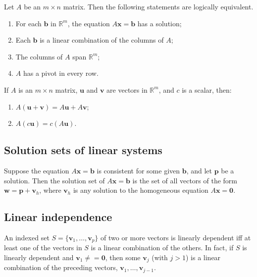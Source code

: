 \documentclass{article}
\begin{document}
\begin{thm}
    Let $A$ be an $m\times n$ matrix. Then the following statements are logically equivalent.
    \begin{enumerate}
        \item[a.] For each $\textbf{b}$ in $\mathbb{R}^m$, the equation $A\textbf{x}=\textbf{b}$ has a solution;
        \item[b.] Each $\textbf{b}$ is a linear combination of the columns of $A$;
        \item[c.] The columns of $A$ span $\mathbb{R}^m$;
        \item[d.] $A$ has a pivot in every row.
    \end{enumerate}
\end{thm}

\begin{thm} 
    If $A$ is an $m\times n$ matrix, $\textbf{u}$ and $\textbf{v}$ are vectors in $\mathbb{R}^m$, and $c$ is a scalar, then:
    \begin{enumerate}
        \item[a.] $A(\textbf{u}+\textbf{v})=A\textbf{u}+A\textbf{v}$;
        \item[b.] $A(c\textbf{u})=c(A\textbf{u})$.
    \end{enumerate}
\end{thm}

\subsection{Solution sets of linear systems}

\begin{thm}
    Suppose the equation $A\textbf{x}=\textbf{b}$ is consistent for some given $\textbf{b}$, and let $\textbf{p}$ be a solution. Then the solution set of $A\textbf{x}=\textbf{b}$ is the set of all vectors of the form $\textbf{w}=\textbf{p}+\textbf{v}_{h}$, where $\textbf{v}_{h}$ is any solution to the homogeneous equation $A\textbf{x}=\textbf{0}$.
\end{thm}

\subsection{Linear independence}

\begin{thm} 
    An indexed set $S=\{\textbf{v}_1,\ldots,\textbf{v}_p\}$ of two or more vectors is linearly dependent iff at least one of the vectors in $S$ is a linear combination of the others. In fact, if $S$ is linearly dependent and $\textbf{v}_1\neq=\textbf{0}$, then some $\textbf{v}_j$ (with $j>1$) is a linear combination of the preceding vectors, $\textbf{v}_1,\ldots,\textbf{v}_{j-1}$.
\end{thm}
\end{document}
